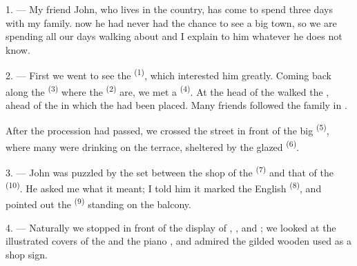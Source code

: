 
\VUsaut{4.0mm}
\VUsaut{3.0mm}

\VUsaut{3.0mm}

1. --- My friend John, who lives in the country, has come to spend three days with my family.
 now he had never had the chance to see a big town, so we are spending all our
days walking about and I explain to him whatever he does not know.

2. --- First we went to see the  \textsuperscript{(1)}, which interested
him greatly. Coming back along the  \textsuperscript{(3)} where the
 \textsuperscript{(2)} are, we met a 
\textsuperscript{(4)}. At the head of the  walked the
, ahead of the  in which the  had
been placed. Many friends followed the family in .

After the procession had passed, we crossed the street in front of the big 
\textsuperscript{(5)}, where many  were drinking  on the
terrace, sheltered by the glazed
 \textsuperscript{(6)}.

3. --- John was puzzled by the  set between the shop of the
 \textsuperscript{(7)} and that of the
 \textsuperscript{(10)}. He asked me what it meant; I told him it
marked the English  \textsuperscript{(8)}, and pointed out the
 \textsuperscript{(9)} standing on the balcony.

\VUsaut{3.0mm}

4. --- Naturally we stopped in front of the display of
, ,  and
; we looked at the illustrated covers of the 
and the piano , and admired the gilded wooden  used as a shop
sign.

